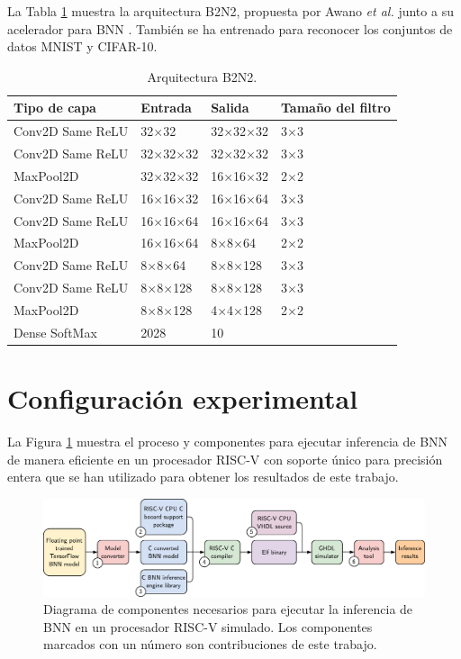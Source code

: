 La Tabla \ref{tab:b2n2_model} muestra la arquitectura B2N2, propuesta por Awano \emph{et al.} junto a su acelerador para BNN \cite{bnn_clt_approx}. También se ha entrenado para reconocer los conjuntos de datos MNIST y CIFAR-10.

\begin{table}[H]
	\centering
	\caption{Arquitectura B2N2.}
	\label{tab:b2n2_model}
	\begin{tabular}{llll}
	\hline
	\textbf{Tipo de capa} & \textbf{Entrada} & \textbf{Salida} & \textbf{Tamaño del filtro}\\ \hline
	Conv2D Same ReLU& 32$\times$32 & 32$\times$32$\times$32 & 3$\times$3 \\
	Conv2D Same  ReLU& 32$\times$32$\times$32 & 32$\times$32$\times$32 & 3$\times$3 \\
	MaxPool2D & 32$\times$32$\times$32 & 16$\times$16$\times$32 & 2$\times$2 \\
	Conv2D Same  ReLU& 16$\times$16$\times$32 & 16$\times$16$\times$64 & 3$\times$3 \\
	Conv2D Same  ReLU& 16$\times$16$\times$64 & 16$\times$16$\times$64 & 3$\times$3 \\
	MaxPool2D & 16$\times$16$\times$64 & 8$\times$8$\times$64 & 2$\times$2 \\
	Conv2D Same  ReLU& 8$\times$8$\times$64 & 8$\times$8$\times$128 & 3$\times$3 \\
	Conv2D Same  ReLU& 8$\times$8$\times$128 & 8$\times$8$\times$128 & 3$\times$3 \\
	MaxPool2D & 8$\times$8$\times$128 & 4$\times$4$\times$128 & 2$\times$2 \\
	Dense SoftMax& 2028 & 10 & \\ \hline
	\end{tabular}
\end{table}

\section{Configuración experimental}

La Figura \ref{fig:experiment_pipeline} muestra el proceso y componentes para ejecutar inferencia de BNN de manera eficiente en un procesador RISC-V con soporte único para precisión entera que se han utilizado para obtener los resultados de este trabajo.

\begin{figure}[H]
	\centering
	\includegraphics[width=\textwidth]{root/Imagenes/metodologia/experiment_pipeline.pdf}
	\caption{Diagrama de componentes necesarios para ejecutar la inferencia de BNN en un procesador RISC-V simulado. Los componentes marcados con un número son contribuciones de este trabajo.}
	\label{fig:experiment_pipeline}
\end{figure}

